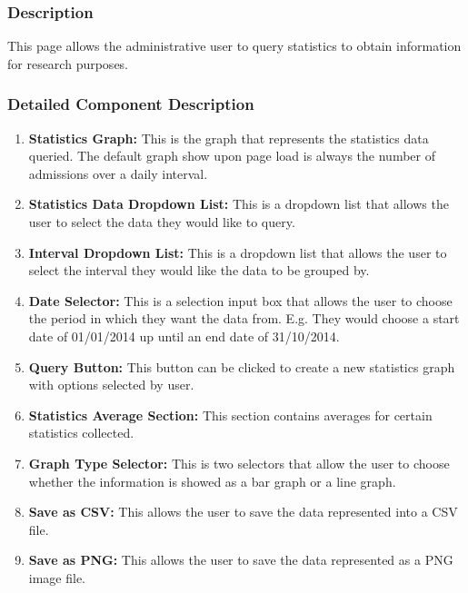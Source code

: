 \documentclass[14pt, a4paper]{article}
\begin{document}
	\subsubsection{Description} This page allows the administrative user to query statistics to obtain information for research purposes.
	\subsubsection{Detailed Component Description}
		\begin{enumerate}
			\item \textbf{Statistics Graph:} This is the graph that represents the statistics data queried. The default graph show upon page load is always the number of admissions over a daily interval. 
			\item \textbf{Statistics Data Dropdown List:} This is a dropdown list that allows the user to select the data they would like to query.
			\item \textbf{Interval Dropdown List:} This is a dropdown list that allows the user to select the interval they would like the data to be grouped by.
			\item \textbf{Date Selector:} This is a selection input box that allows the user to choose the period in which they want the data from. E.g. They would choose a start date of 01/01/2014 up until an end date of 31/10/2014.
			\item \textbf{Query Button:} This button can be clicked to create a new statistics graph with options selected by user.
			\item \textbf{Statistics Average Section:} This section contains averages for certain statistics collected.
			\item \textbf{Graph Type Selector: } This is two selectors that allow the user to choose whether the information is showed as a bar graph or a line graph.
			\item \textbf{Save as CSV:} This allows the user to save the data represented into a CSV file.
			\item \textbf{Save as PNG:} This allows the user to save the data represented as a PNG image file.
		\end{enumerate}
\end{document}
